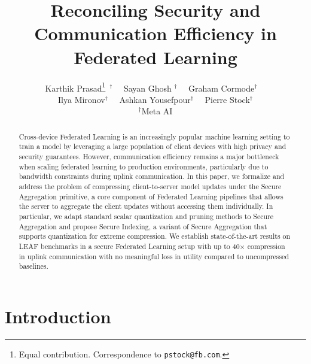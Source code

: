 \documentclass[11pt]{article}
\title{Reconciling Security and Communication Efficiency in Federated Learning}
\author{
Karthik Prasad\thanks{Equal contribution. Correspondence to \texttt{pstock@fb.com}.} $^{~\dagger}$~~ Sayan Ghosh\footnotemark[1]$^{~~\dagger}$~~ Graham Cormode$^\dagger$~~ \\ {Ilya Mironov$^\dagger$~~ Ashkan Yousefpour$^\dagger$~~ Pierre Stock$^\dagger$} \\ $^\dagger$Meta AI
}
\newcommand{\karthik}[1]{{\color{blue}Karthik: #1}}
\begin{document}
\maketitle
\begin{abstract}
Cross-device Federated Learning is an increasingly popular machine learning setting to train a model by leveraging
a large population of client devices with high privacy and security guarantees.
However,
communication efficiency remains a major bottleneck when scaling federated learning to production environments, particularly due to bandwidth constraints during uplink communication.
In this paper, we formalize and address the problem of compressing client-to-server model updates
under the Secure Aggregation primitive, a core component of Federated Learning pipelines that allows the server to aggregate the client updates without accessing them individually.
In particular, we adapt standard scalar quantization and pruning methods
to Secure Aggregation and propose Secure Indexing, a variant of Secure Aggregation that supports quantization for extreme compression.
We establish state-of-the-art results on LEAF benchmarks in a secure Federated Learning setup with up to 40$\times$ compression in uplink communication
with no meaningful loss in utility compared to uncompressed baselines.
\end{abstract}


\section{Introduction}
\label{sec:intro}
\end{document}
